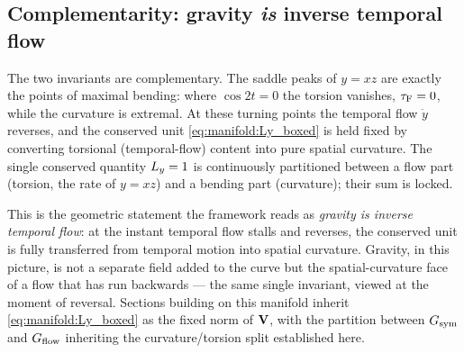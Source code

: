 \subsection{Complementarity: gravity \emph{is} inverse temporal flow}

The two invariants are complementary. The saddle peaks of $y=xz$ are exactly the points of maximal bending: where $\cos 2t=0$ the torsion vanishes, $\tau_{\mathrm{F}}=0$, while the curvature is extremal. At these turning points the temporal flow $\dot y$ reverses, and the conserved unit \eqref{eq:manifold:Ly_boxed} is held fixed by converting torsional (temporal-flow) content into pure spatial curvature. The single conserved quantity $L_{y}=1$ is continuously partitioned between a flow part (torsion, the rate of $y=xz$) and a bending part (curvature); their sum is locked.

This is the geometric statement the framework reads as \emph{gravity is inverse temporal flow}: at the instant temporal flow stalls and reverses, the conserved unit is fully transferred from temporal motion into spatial curvature. Gravity, in this picture, is not a separate field added to the curve but the spatial-curvature face of a flow that has run backwards — the same single invariant, viewed at the moment of reversal. Sections building on this manifold inherit \eqref{eq:manifold:Ly_boxed} as the fixed norm of $\mathbf{V}$, with the partition between $G_{\mathrm{sym}}$ and $G_{\mathrm{flow}}$ inheriting the curvature/torsion split established here.
